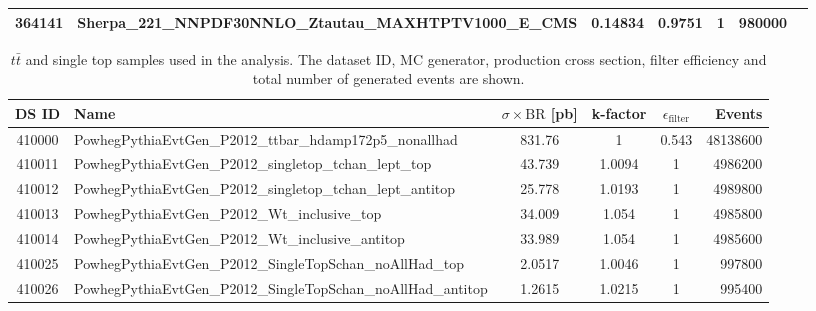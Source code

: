\begin{landscape}
\begin{table}[!htb]
\begin{footnotesize}
\begin{center}
\begin{tabular}{|c|l|c|c|c|c|r|}
				364141 & Sherpa\_221\_NNPDF30NNLO\_Ztautau\_MAXHTPTV1000\_E\_CMS & 0.14834 & 0.9751 & 1 & 980000 \\
				\hline
			\end{tabular}
		\end{center}
	\end{footnotesize}
\end{table}
\begin{table}[!htb]
	\caption{$t\bar{t}$ and single top samples used in the analysis. The dataset ID, MC generator, production cross section, filter efficiency and total number of generated events are shown.}
	\label{tabular:mc_samples_top}
	\begin{footnotesize}
		\begin{center}
			\begin{tabular}{|c|l|c|c|c|r|}
				\hline
				DS ID  & Name & $\sigma\times\text{BR}$ [pb]  & k-factor & $\epsilon_{\text{filter}}$ & Events \\ \hline
				410000 & PowhegPythiaEvtGen\_P2012\_ttbar\_hdamp172p5\_nonallhad & 831.76 & 1 & 0.543 & 48138600 \\
				410011 & PowhegPythiaEvtGen\_P2012\_singletop\_tchan\_lept\_top & 43.739 & 1.0094 & 1 & 4986200 \\
				410012 & PowhegPythiaEvtGen\_P2012\_singletop\_tchan\_lept\_antitop & 25.778 & 1.0193 & 1 & 4989800 \\
				410013 & PowhegPythiaEvtGen\_P2012\_Wt\_inclusive\_top & 34.009 & 1.054 & 1 & 4985800 \\
				410014 & PowhegPythiaEvtGen\_P2012\_Wt\_inclusive\_antitop & 33.989 & 1.054 & 1 & 4985600 \\
				410025 & PowhegPythiaEvtGen\_P2012\_SingleTopSchan\_noAllHad\_top & 2.0517 & 1.0046 & 1 & 997800 \\
				410026 & PowhegPythiaEvtGen\_P2012\_SingleTopSchan\_noAllHad\_antitop & 1.2615 & 1.0215 & 1 & 995400 \\
				\hline
			\end{tabular}
		\end{center}
	\end{footnotesize}
\end{table}


\end{landscape}
